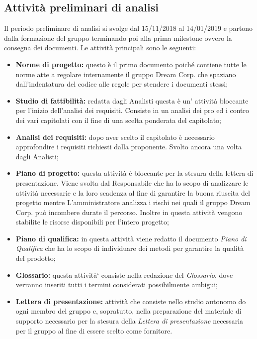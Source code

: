 \subsection{Attività preliminari di analisi}
Il periodo preliminare di analisi si svolge dal 15/11/2018 al 14/01/2019 e partono dalla formazione del gruppo terminando poi alla prima milestone ovvero la consegna dei documenti. \newline
Le attività principali sono le seguenti:
\begin{itemize}
	\item\textbf{Norme di progetto:} questo è il primo documento poiché contiene tutte le norme atte a regolare internamente il gruppo Dream Corp. che spaziano dall'indentatura del codice alle regole per stendere i documenti stessi;
	\item\textbf{Studio di fattibilità:} redatta dagli Analisti questa è un' attività bloccante per l'inizio dell'analisi dei requisiti. Consiste in un analisi dei pro ed i contro dei vari capitolati con il fine di una scelta ponderata del capitolato;
	\item\textbf{Analisi dei requisiti:} dopo aver scelto il capitolato è necessario approfondire i requisiti richiesti dalla proponente. Svolto ancora una volta dagli Analisti;
	\item\textbf{Piano di progetto:} questa attività è bloccante per la stesura della lettera di presentazione. Viene svolta dal Responsabile che ha lo scopo di analizzare le attività necessarie e la loro scadenza al fine di garantire la  buona riuscita del progetto mentre L'amministratore analizza i rischi nei quali il gruppo Dream Corp. può incombere durate il percorso. Inoltre in questa attività vengono stabilite le risorse disponibili per l'intero progetto;
	\item\textbf{Piano di qualifica:} in questa attività viene redatto il documento \textit{Piano di Qualifica} che ha lo scopo di individuare dei metodi per garantire la qualità del prodotto;
	\item\textbf{Glossario:} questa attività` consiste nella redazione del \textit{Glossario}, dove verranno inseriti tutti i termini considerati possibilmente ambigui;
	\item\textbf{Lettera di presentazione:} attività che consiste nello studio autonomo do ogni membro del gruppo e, sopratutto, nella preparazione del materiale di supporto necessario per la stesura della \textit{Lettera di presentazione} necessaria per il gruppo al fine di essere scelto come fornitore.
\end{itemize}

